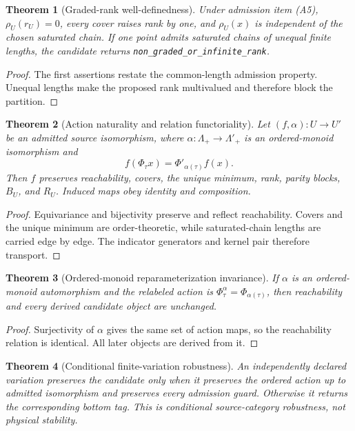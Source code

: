 \documentclass[11pt]{article}
\newtheorem{theorem}{Theorem}
\begin{document}
\begin{theorem}[Graded-rank well-definedness]
Under admission item (A5), \(\rho_U(r_U)=0\), every cover raises rank by one,
and \(\rho_U(x)\) is independent of the chosen saturated chain. If one point
admits saturated chains of unequal finite lengths, the candidate returns
\texttt{non\_graded\_or\_infinite\_rank}.
\end{theorem}
\begin{proof}
The first assertions restate the common-length admission property. Unequal
lengths make the proposed rank multivalued and therefore block the partition.
\end{proof}

\begin{theorem}[Action naturality and relation functoriality]
Let \((f,\alpha):U\to U'\) be an admitted source isomorphism, where
\(\alpha:\Lambda_+\to\Lambda'_+\) is an ordered-monoid isomorphism and
\[
 f(\Phi_\tau x)=\Phi'_{\alpha(\tau)}f(x).
\]
Then \(f\) preserves reachability, covers, the unique minimum, rank, parity
blocks, \(B_U\), and \(R_U\). Induced maps obey identity and composition.
\end{theorem}
\begin{proof}
Equivariance and bijectivity preserve and reflect reachability. Covers and the
unique minimum are order-theoretic, while saturated-chain lengths are carried
edge by edge. The indicator generators and kernel pair therefore transport.
\end{proof}

\begin{theorem}[Ordered-monoid reparameterization invariance]
If \(\alpha\) is an ordered-monoid automorphism and the relabeled action is
\(\Phi^\alpha_\tau=\Phi_{\alpha(\tau)}\), then reachability and every derived
candidate object are unchanged.
\end{theorem}
\begin{proof}
Surjectivity of \(\alpha\) gives the same set of action maps, so the
reachability relation is identical. All later objects are derived from it.
\end{proof}

\begin{theorem}[Conditional finite-variation robustness]
An independently declared variation preserves the candidate only when it
preserves the ordered action up to admitted isomorphism and preserves every
admission guard. Otherwise it returns the corresponding bottom tag. This is
conditional source-category robustness, not physical stability.
\end{theorem}
\end{document}
